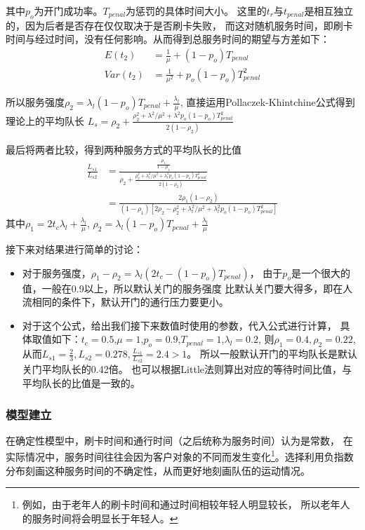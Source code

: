 其中$p_o$为开门成功率。$T_{penal}$为惩罚的具体时间大小。
这里的$t_r$与$t_{penal}$是相互独立的，因为后者是否存在仅仅取决于是否刷卡失败，
而这对随机服务时间，即刷卡时间与经过时间，没有任何影响。从而得到总服务时间的期望与方差如下：
\begin{equation}
    \begin{aligned}
        E(t_2) &=\frac{1}{\mu}+(1-p_o)T_{penal} \\
        Var(t_2)&=\frac{1}{\mu^2}+p_o(1-p_o)T_{penal}^2
    \end{aligned}
\end{equation}

所以服务强度$\rho_2=\lambda_l (1-p_o)T_{penal}+\frac{\lambda_l}{\mu}$,
直接运用Pollaczek-Khintchine公式得到理论上的平均队长
$L_s=\rho_2+\frac{\rho_2^2+\lambda^2/\mu^2+\lambda^2 p_o(1-p_o)T_{penal}^2}{2(1-\rho_2)}$
\par 最后将两者比较，得到两种服务方式的平均队长的比值
\begin{equation}
    \begin{aligned}
        \frac{L_{s1}}{L_{s2}}&=\frac{\frac{\rho_1}{1-\rho_1}}{\rho_2+\frac{\rho_2^2+\lambda_l^2/\mu^2+\lambda_l^2 p_o(1-p_o)T_{penal}^2}{2(1-\rho_2)}} \\
        &=\frac{2\rho_1(1-\rho_2)}{(1-\rho_1)[2\rho_2-\rho_2^2+\lambda_l^2/\mu^2+\lambda_l^2 p_o(1-p_o)T_{penal}^2]}
    \end{aligned}
\end{equation}
其中$\rho_1=2t_c\lambda_l+\frac{\lambda_l}{\mu}$,
$\rho_2=\lambda_l (1-p_o)T_{penal}+\frac{\lambda_l}{\mu}$

接下来对结果进行简单的讨论：
\begin{itemize}
    \item 对于服务强度，$\rho_1-\rho_2=\lambda_l(2t_c-(1-p_o)T_{penal})$，
    由于$p_o$是一个很大的值，一般在0.9以上，所以默认关门的服务强度
    比默认关门要大得多，即在人流相同的条件下，默认开门的通行压力要更小。
    \item 对于这个公式，给出我们接下来数值时使用的参数，代入公式进行计算，
    具体取值如下：$t_c=0.5$,$\mu=1$,$p_o=0.9$,$T_{penal}=1$,$\lambda_l=0.2$,
    则$\rho_1=0.4,\rho_2=0.22$,从而$L_{s1}=\frac{2}{3},L_{s2}=0.278,\frac{L_{s1}}{L_{s2}}=2.4>1$。
    所以一般默认开门的平均队长是默认关门平均队长的0.42倍。
    也可以根据Little法则算出对应的等待时间比值，与平均队长的比值是一致的。
\end{itemize}

\subsubsection{模型建立}
在确定性模型中，刷卡时间和通行时间（之后统称为服务时间）认为是常数，
在实际情况中，服务时间往往会因为客户对象的不同而发生变化\footnote{
    例如，由于老年人的刷卡时间和通过时间相较年轻人明显较长，
    所以老年人的服务时间将会明显长于年轻人。
}。选择利用负指数分布刻画这种服务时间的不确定性，从而更好地刻画队伍的运动情况。


